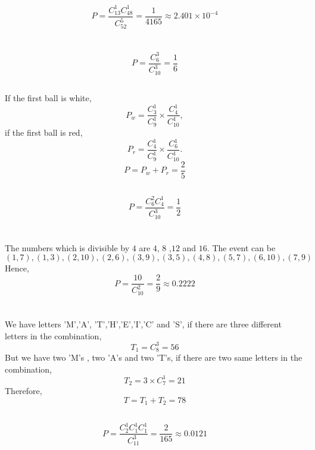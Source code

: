\documentclass{article}
\begin{document}
        \subsection{}
                $$P=\frac{C_{13}^1 C_{48}^1}{C_{52}^5}=\frac{1}{4165}\approx 2.401\times 10^{-4}$$

    \section{}
        \subsection{}
                $$P=\frac{C_6^3}{C_{10}^3}=\frac{1}{6}$$
        
        \subsection{}
                If the first ball is white,
                        $$P_w=\frac{C_3^1}{C_9^1}\times \frac{C_4 ^1}{C_{10}^1},$$
                if the first ball is red,
                        $$P_r=\frac{C_4^1}{C_9^1}\times \frac{C_6 ^1}{C_{10}^1}.$$
                $$P=P_w+P_r=\frac{2}{5}$$

        \subsection{}
                $$P=\frac{C_6^2C_4^1}{C_{10}^3}=\frac{1}{2}$$

    \section{}
                The numbers which is divisible by $4$ are $4$, $8$ ,$12$ and $16$.
                The event can be $(1,7),(1,3),(2,10),(2,6),(3,9),(3,5),(4,8),(5,7),(6,10),(7,9)$
                \\
                Hence,
                $$P=\frac{10}{C_{10}^2}=\frac{2}{9}\approx 0.2222$$

    \section{}
        \subsection{}  
                We have letters 'M','A', 'T','H','E','I','C' and 'S', if there are three different letters in the combination,           
                $$T_1=C_{8}^{3}=56$$
                But we have two 'M's , two 'A's and two 'T's, if there are two same letters in the combination,
                $$T_2=3\times C_7 ^1=21$$
                Therefore,
                $$T=T_1+T_2=78$$
        \subsection{}
                $$P=\frac{C_{2}^1C_{1}^1C_{1}^1}{C_{11}^3}=\frac{2}{165}\approx 0.0121$$
\end{document}

